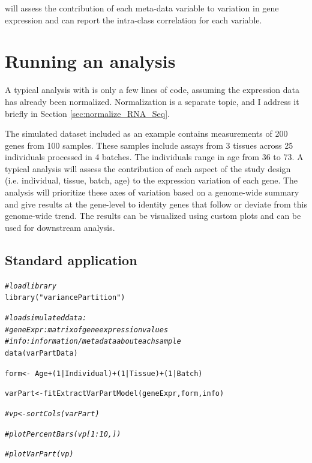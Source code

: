 \documentclass[12pt]{article}\usepackage[]{graphicx}\usepackage[]{xcolor}
\newcommand{\hlnum}[1]{\textcolor[rgb]{0.816,0.125,0.439}{#1}}%
\newcommand{\hlstr}[1]{\textcolor[rgb]{0.251,0.627,0.251}{#1}}%
\newcommand{\hlcom}[1]{\textcolor[rgb]{0.502,0.502,0.502}{\textit{#1}}}%
\newcommand{\hlopt}[1]{\textcolor[rgb]{0,0,0}{#1}}%
\newcommand{\hlstd}[1]{\textcolor[rgb]{0.251,0.251,0.251}{#1}}%
\newcommand{\hlkwb}[1]{\textcolor[rgb]{0,0,0}{#1}}%
\newcommand{\hlkwd}[1]{\textcolor[rgb]{0.878,0.439,0.125}{#1}}%
\newenvironment{knitrout}{}{} %
\begin{document}
  will assess the contribution of each meta-data variable to variation in gene expression and can report the intra-class correlation for each variable.   


\pagebreak
\section{Running an analysis}

A typical analysis with  is only a few lines of \R{} code, assuming the expression data has already been normalized.  Normalization is a separate topic, and I address it briefly 
in Section \ref{sec:normalize_RNA_Seq}.

The simulated dataset included as an example contains measurements of 200 genes from 100 samples.  These samples include assays from 3 tissues across 25 individuals processed in 4 batches.  The individuals range in age from 36 to 73.  A typical  analysis will assess the contribution of each aspect of the study design (i.e. individual, tissue, batch, age) to the expression variation of each gene.  The analysis will prioritize these axes of variation based on a genome-wide summary and give results at the gene-level to identity genes that follow or deviate from this genome-wide trend.   The results can be visualized using custom plots and can be used for downstream analysis.

\subsection{Standard application}


\begin{knitrout}
\color{fgcolor}\begin{kframe}
\begin{alltt}
\hlcom{# load library}
\hlkwd{library}\hlstd{(}\hlstr{"variancePartition"}\hlstd{)}

\hlcom{# load simulated data:}
\hlcom{# geneExpr: matrix of gene expression values}
\hlcom{# info: information/metadata about each sample}
\hlkwd{data}\hlstd{(varPartData)}

\hlstd{form} \hlkwb{<-} \hlopt{~} \hlstd{Age} \hlopt{+} \hlstd{(}\hlnum{1} \hlopt{|} \hlstd{Individual)} \hlopt{+} \hlstd{(}\hlnum{1} \hlopt{|} \hlstd{Tissue)} \hlopt{+} \hlstd{(}\hlnum{1} \hlopt{|} \hlstd{Batch)}

\hlstd{varPart} \hlkwb{<-} \hlkwd{fitExtractVarPartModel}\hlstd{(geneExpr, form, info)}

\hlcom{# vp <- sortCols( varPart )}

\hlcom{# plotPercentBars( vp[1:10,] )}

\hlcom{# plotVarPart( vp )}
\end{alltt}
\end{kframe}
\end{knitrout}
\end{document}
